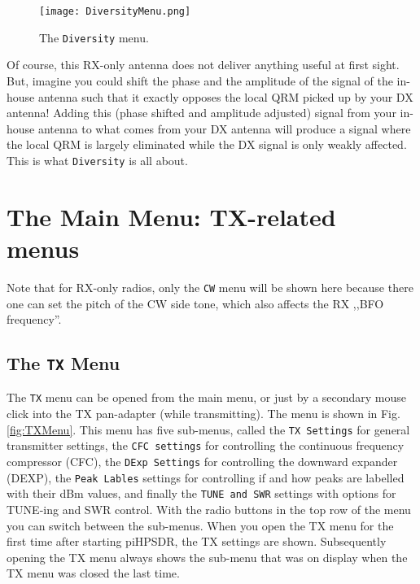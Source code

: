 \documentclass[12pt]{book}
\def\rett#1{\texttt{\color{red}#1}}
\def\bltt#1{\texttt{\color{blue}#1}}
\def\pH{pi\-HPSDR\xspace}
\begin{document}
\begin{figure}[ht]
\center
\texttt{[image: DiversityMenu.png]}
\caption{The \bltt{Diversity} menu.}
\label{fig:DiversityMenu}
\end{figure}

Of course, this RX-only antenna does not deliver anything useful at first sight. But, imagine
you could shift the phase and the amplitude of the signal of the in-house antenna such that it
exactly opposes the local QRM picked up by your DX antenna! Adding this (phase shifted and amplitude
adjusted) signal from your in-house antenna to what comes from your DX antenna will produce
a signal where the local QRM is largely eliminated while the DX signal is only weakly affected.
This is what \bltt{Diversity} is all about.

\chapter[TX-related menus]{The Main Menu: TX-related menus}

Note that for RX-only radios, only the \bltt{CW} menu will be shown here
because there one can set the pitch of the CW side tone, which also affects
the RX ,,BFO frequency''.


\section{The \texttt{TX} Menu}

The \bltt{TX} menu can be opened from the main menu, or just by a secondary mouse click
into the TX pan-adapter (while transmitting). The menu is shown in Fig. \ref{fig:TXMenu}.
This menu has five sub-menus, called the \rett{TX Settings} for general transmitter settings,
the \rett{CFC settings} for controlling the continuous frequency compressor (CFC),  the
\rett{DExp Settings} for controlling the downward expander (DEXP),  the \rett{Peak Lables}
settings for controlling if and how peaks are labelled with their dBm values,
and finally the \rett{TUNE and SWR} settings with options for TUNE-ing and SWR control.
With the radio buttons
in the top row of the menu you can switch between the sub-menus. When you open the TX
menu for the first time after starting \pH, the TX settings are shown. Subsequently opening
the TX menu always shows the sub-menu that was on display when the TX  menu was closed the last
time.
\end{document}
